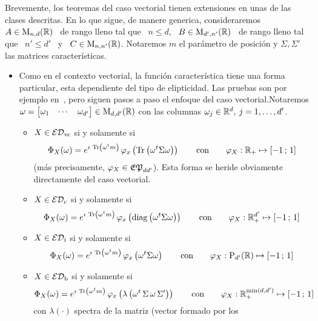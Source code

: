 Brevemente, los  teoremas del caso vectorial  tienen extensiones en  unas de las
clases descritas. En  lo que sigue, de manere generica,  consideraremos \ $A \in
\mathrm{M}_{n,d}(\mathbb{R})$  \  de   rango  lleno  tal  que  \  $n  \le   d$,  \  $B  \in
\mathrm{M}_{d',n'}(\mathbb{R})$  \ de  rango lleno  tal que  \ $n'  \le d'$  \ y  \  $C \in
\mathrm{M}_{n,n'}(\mathbb{R})$.   Notaremos $m$  el  par\'ametro de  posici\'on y  $\Sigma,
\Sigma'$ las matrices caracter\'isticas.
%
\begin{itemize}
%
\item Como  en el  contexto vectorial, la  funci\'on caracter\'istica  tiene una
  forma particular,  esta dependiente del  tipo de elipticidad. Las  pruebas son
  por ejemplo  en~\cite{FanChe84, JenGoo81, GupNag99}, pero siguen  pasos a paso
  el enfoque  del caso vectorial.Notaremos $\omega =  \begin{bmatrix} \omega_1 &
    \cdots & \omega_{d'} \end{bmatrix}  \in \mathrm{M}_{d,d'}(\mathbb{R})$ con las columnas
  $\omega_j \in \mathbb{R}^d, \: j = 1, \ldots , d'$.
  \begin{itemize}
  \item  $X \in \mathcal{ED}_{\mathrm{vc}}$ si y solamente si
  \[
  \Phi_X(\omega) = e^{\imath \, \operatorname{Tr}\left( \omega^t m \right)} \, \varphi_x\left(
    \operatorname{Tr}\left( \omega^t  \Sigma \omega  \right) \right) \qquad  \mbox{con} \qquad
  \varphi_X: \mathbb{R}_+ \mapsto [-1 \, ; \, 1]
  \]
  (m\'as  precisamente, $\varphi_X  \in  \mathfrak{EP}_{d d'}$).  Esta  forma se  heride
  obviamente directamente del caso vectorial.
  \item  $X \in \mathcal{ED}_{\mathrm{c}}$ si y solamente si
  \[
  \Phi_X(\omega) = e^{\imath \, \operatorname{Tr}\left( \omega^t m \right)} \, \varphi_x\left(
    \operatorname{diag}\left( \omega^t \Sigma \omega  \right) \right) \qquad \mbox{con} \qquad
  \varphi_X: \mathbb{R}_+^{d'} \mapsto [-1 \, ; \, 1]
  \]
  \item $X \in \mathcal{ED}_{\mathrm{i}}$  si y solamente si
  \[
  \Phi_X(\omega) = e^{\imath \, \operatorname{Tr}\left( \omega^t m \right)} \, \varphi_x\left(
    \omega^t   \Sigma  \omega  \right)   \qquad  \mbox{con}   \qquad  \varphi_X:
  \mathrm{P}_{d'}(\mathbb{R}) \mapsto [-1 \, ; \, 1]
  \]
  \item $X \in \mathcal{ED}_{\mathrm{b}}$  si y solamente si
  \[
  \Phi_X(\omega) = e^{\imath \, \operatorname{Tr}\left( \omega^t m \right)} \, \varphi_x\left(
    \lambda\left( \omega^t \, \Sigma \, \omega \, \Sigma' \right) \right) \qquad
  \mbox{con} \qquad \varphi_X: \mathbb{R}_+^{\min(d,d')} \mapsto [-1 \, ; \, 1]
  \]
  con   $\lambda(\cdot)$  spectra  de   la  matriz   (vector  formado   por  los

\end{itemize}
\end{itemize}
